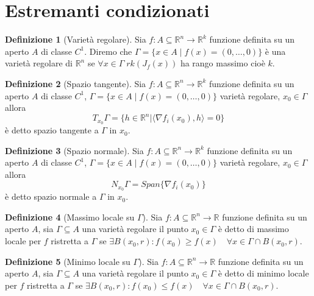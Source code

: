 \documentclass[leqno]{article}
\theoremstyle{definition}
\newtheorem{definition}{Definizione}[section]
\numberwithin{equation}{section}
\theoremstyle{remark}
\begin{document}
	\section{Estremanti condizionati}
	\begin{definition}[Varietà regolare]
		Sia $f:A\subseteq \mathbb{R}^n \rightarrow \mathbb{R}^{k}$ funzione definita su un aperto $A$ di classe $C^1$. Diremo che $\Gamma=\{ x \in A \; | \; f(x)=(0,\dots,0)\}$ è una varietà regolare di $\mathbb{R}^n$ se $\forall x \in \Gamma \; rk(J_f(x))$ ha rango massimo cioè $k$.
	\end{definition}
	\begin{definition}[Spazio tangente]
		Sia $f:A\subseteq \mathbb{R}^n \rightarrow \mathbb{R}^{k}$ funzione definita su un aperto $A$ di classe $C^1$, $\Gamma=\{ x \in A \; | \; f(x)=(0,\dots,0)\}$ varietà regolare, $x_0\in \Gamma$ allora
		\begin{equation}
			T_{x_0}\Gamma=\{h\in \mathbb{R}^n | \langle \nabla f_i(x_0), h \rangle = 0\}
		\end{equation}
		è detto spazio tangente a $\Gamma$ in $x_0$.
	\end{definition}
	\begin{definition}[Spazio normale]
		Sia $f:A\subseteq \mathbb{R}^n \rightarrow \mathbb{R}^{k}$ funzione definita su un aperto $A$ di classe $C^1$, $\Gamma=\{ x \in A \; | \; f(x)=(0,\dots,0)\}$ varietà regolare, $x_0\in \Gamma$ allora
		\begin{equation}
			N_{x_0}\Gamma=Span\{\nabla f_i (x_0)\}
		\end{equation}
		è detto spazio normale a $\Gamma$ in $x_0$.
	\end{definition}
	\begin{definition}[Massimo locale su $\Gamma$]
		Sia $f:A\subseteq \mathbb{R}^n \rightarrow \mathbb{R}$ funzione definita su un aperto $A$, sia $\Gamma \subseteq A$ una varietà regolare il punto $x_0 \in \Gamma$ è detto di massimo locale per $f$ ristretta a $\Gamma$ se $\exists B(x_0,r) : f(x_0)\ge f(x) \quad \forall x \in \Gamma \cap B(x_0,r)$.
	\end{definition}
	\begin{definition}[Minimo locale su $\Gamma$]
		Sia $f:A\subseteq \mathbb{R}^n \rightarrow \mathbb{R}$ funzione definita su un aperto $A$, sia $\Gamma \subseteq A$ una varietà regolare il punto $x_0 \in \Gamma$ è detto di minimo locale per $f$ ristretta a $\Gamma$ se $\exists B(x_0,r) : f(x_0)\le f(x) \quad \forall x \in \Gamma \cap B(x_0,r)$.
	\end{definition}
\end{document}
